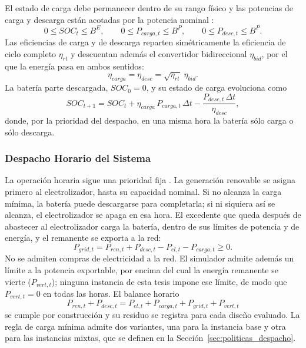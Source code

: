 El estado de carga debe permanecer dentro de su rango físico y las potencias de carga y descarga están acotadas por la potencia nominal \cite{Li2024WPEB}:
\begin{equation}
0\leq SOC_t\leq B^{E},\qquad
0\leq P_{carga,t}\leq B^{P},\qquad
0\leq P_{desc,t}\leq B^{P}.
\end{equation}
Las eficiencias de carga y de descarga reparten simétricamente la eficiencia de ciclo completo $\eta_{rt}$ y descuentan además el convertidor bidireccional $\eta_{bid}$, por el que la energía pasa en ambos sentidos:
\begin{equation}
\eta_{carga}=\eta_{desc}=\sqrt{\eta_{rt}}\;\eta_{bid}.
\end{equation}
La batería parte descargada, $SOC_0=0$, y su estado de carga evoluciona como
\begin{equation}
SOC_{t+1}=SOC_t+\eta_{carga}\,P_{carga,t}\,\Delta t-\frac{P_{desc,t}\,\Delta t}{\eta_{desc}},
\end{equation}
donde, por la prioridad del despacho, en una misma hora la batería sólo carga o sólo descarga.

\subsubsection{Despacho Horario del Sistema}

La operación horaria sigue una prioridad fija \cite{Li2024WPEB}. La generación renovable se asigna primero al electrolizador, hasta su capacidad nominal. Si no alcanza la carga mínima, la batería puede descargarse para completarla; si ni siquiera así se alcanza, el electrolizador se apaga en esa hora. El excedente que queda después de abastecer al electrolizador carga la batería, dentro de sus límites de potencia y de energía, y el remanente se exporta a la red:
\begin{equation}
P_{grid,t}=P_{ren,t}+P_{desc,t}-P_{el,t}-P_{carga,t}\geq0.
\end{equation}
No se admiten compras de electricidad a la red. El simulador admite además un límite a la potencia exportable, por encima del cual la energía remanente se vierte ($P_{vert,t}$); ninguna instancia de esta tesis impone ese límite, de modo que $P_{vert,t}=0$ en todas las horas. El balance horario
\begin{equation}
P_{ren,t}+P_{desc,t}=P_{el,t}+P_{carga,t}+P_{grid,t}+P_{vert,t}
\end{equation}
se cumple por construcción y su residuo se registra para cada diseño evaluado. La regla de carga mínima admite dos variantes, una para la instancia base y otra para las instancias mixtas, que se definen en la Sección~\ref{sec:politicas_despacho}.

